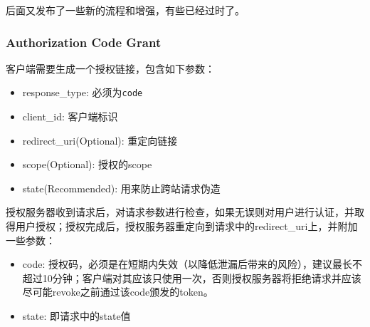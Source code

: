 \documentclass[12pt]{article}
\begin{document}
后面又发布了一些新的流程和增强，有些已经过时了。

\subsubsection{Authorization Code Grant}\label{authorization-code-grant}

客户端需要生成一个授权链接，包含如下参数：

\begin{itemize}
\tightlist
\item
  response\_type: 必须为\texttt{code}
\item
  client\_id: 客户端标识
\item
  redirect\_uri(Optional): 重定向链接
\item
  scope(Optional): 授权的scope
\item
  state(Recommended): 用来防止跨站请求伪造
\end{itemize}

\begin{Shaded}
\begin{Highlighting}[]
\OperatorTok{://}\OperatorTok{{-}}\OperatorTok{/}
  \OperatorTok{=}
  \OperatorTok{\&}\OperatorTok{=}
  \OperatorTok{\&}\OperatorTok{=}\OperatorTok{://}\OperatorTok{/}\OperatorTok{/}\OperatorTok{{-}}
  \OperatorTok{\&}\OperatorTok{=}\OperatorTok{+}
  \OperatorTok{\&}\OperatorTok{=}\OperatorTok{{-}}
\end{Highlighting}
\end{Shaded}

授权服务器收到请求后，对请求参数进行检查，如果无误则对用户进行认证，并取得用户授权；授权完成后，授权服务器重定向到请求中的redirect\_uri上，并附加一些参数：

\begin{itemize}
\tightlist
\item
  code: 授权码，必须是在短期内失效（以降低泄漏后带来的风险），建议最长不超过10分钟；客户端对其应该只使用一次，否则授权服务器将拒绝请求并应该尽可能revoke之前通过该code颁发的token。
\item
  state: 即请求中的state值
\end{itemize}
\end{document}
